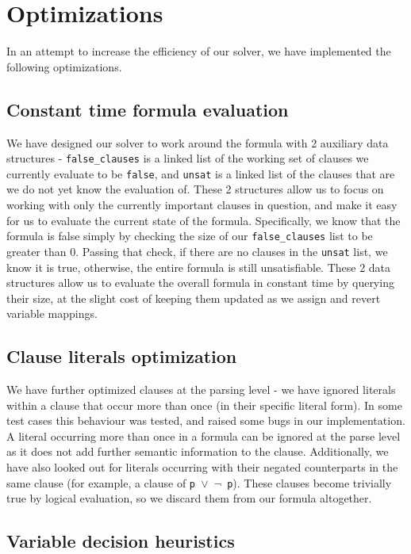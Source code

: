 \documentclass[a4paper]{article}
\begin{document}
\section{Optimizations}

In an attempt to increase the efficiency of our solver, we have implemented the following optimizations.

\subsection{Constant time formula evaluation}

We have designed our solver to work around the formula with 2 auxiliary data structures -  \texttt{false\_clauses} is a linked list of the working set of clauses we currently evaluate to be \texttt{false}, and \texttt{unsat} is a linked list of the clauses that are we do not yet know the evaluation of. These 2 structures allow us to focus on working with only the currently important clauses in question, and make it easy for us to evaluate the current state of the formula. Specifically, we know that the formula is false simply by checking the size of our \texttt{false\_clauses} list to be greater than 0. Passing that check, if there are no clauses in the \texttt{unsat} list, we know it is true, otherwise, the entire formula is still unsatisfiable. These 2 data structures allow us to evaluate the overall formula in constant time by querying their size, at the slight cost of keeping them updated as we assign and revert variable mappings.

\subsection{Clause literals optimization}
We have further optimized clauses at the parsing level - we have ignored literals within a clause that occur more than once (in their specific literal form). In some test cases this behaviour was tested, and raised some bugs in our implementation. A literal occurring more than once in a formula can be ignored at the parse level as it does not add further semantic information to the clause. Additionally, we have also looked out for literals occurring with their negated counterparts in the same clause (for example, a clause of \texttt{p $\vee$ $\neg$ p}). These clauses become trivially true by logical evaluation, so we discard them from our formula altogether.


\subsection{Variable decision heuristics}
\end{document}
